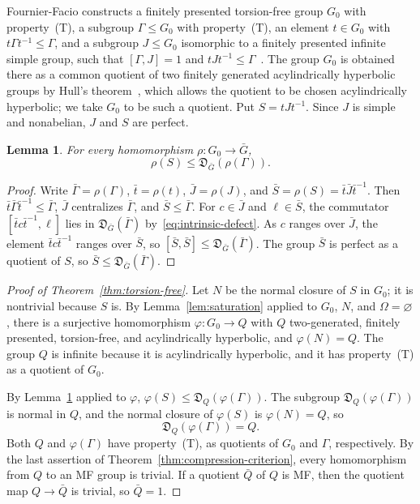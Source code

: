 \documentclass[11pt]{amsart}
\newtheorem{lemma}[theorem]{Lemma}
\theoremstyle{plain}
\begin{document}
Fournier-Facio constructs a finitely presented torsion-free group $G_0$
with property~\textup{(T)}, a subgroup $\Gamma\le G_0$ with
property~\textup{(T)}, an element $t\in G_0$ with
$t\Gamma t^{-1}\le\Gamma$, and a subgroup $J\le G_0$ isomorphic to a
finitely presented infinite simple group, such that $[\Gamma,J]=1$ and
$tJt^{-1}\le\Gamma$~\cite[\S2]{FFF}.  The group $G_0$ is obtained there
as a common quotient of two finitely generated acylindrically hyperbolic
groups by Hull's theorem~\cite[Corollary~7.4]{Hull}, which allows the
quotient to be chosen acylindrically hyperbolic; we take $G_0$ to be
such a quotient.  Put $S=tJt^{-1}$.  Since $J$ is simple and
nonabelian, $J$ and $S$ are perfect.

\begin{lemma}\label{lem:commutator-in-defect}
For every homomorphism $\rho\colon G_0\to\bar G$,
\[
 \rho(S)\le\mathfrak D_{\bar G}(\rho(\Gamma)).
\]
\end{lemma}

\begin{proof}
Write $\bar\Gamma=\rho(\Gamma)$, $\bar t=\rho(t)$, $\bar J=\rho(J)$, and
$\bar S=\rho(S)=\bar t\bar J\bar t^{-1}$.  Then
$\bar t\bar\Gamma\bar t^{-1}\le\bar\Gamma$, $\bar J$ centralizes
$\bar\Gamma$, and $\bar S\le\bar\Gamma$.  For $c\in\bar J$ and
$\ell\in\bar S$, the commutator $[\bar tc\bar t^{-1},\ell]$ lies in
$\mathfrak D_{\bar G}(\bar\Gamma)$ by~\eqref{eq:intrinsic-defect}.  As $c$
ranges over $\bar J$, the element $\bar tc\bar t^{-1}$ ranges over
$\bar S$, so $[\bar S,\bar S]\le\mathfrak D_{\bar G}(\bar\Gamma)$.  The
group $\bar S$ is perfect as a quotient of $S$, so
$\bar S\le\mathfrak D_{\bar G}(\bar\Gamma)$.
\end{proof}

\begin{proof}[Proof of Theorem~\ref{thm:torsion-free}]
Let $N$ be the normal closure of $S$ in $G_0$; it is nontrivial because
$S$ is.  By Lemma~\ref{lem:saturation} applied to $G_0$, $N$, and
$\Omega=\varnothing$, there is a surjective homomorphism
$\varphi\colon G_0\to Q$ with $Q$ two-generated, finitely presented,
torsion-free, and acylindrically hyperbolic, and $\varphi(N)=Q$.  The
group $Q$ is infinite because it is acylindrically hyperbolic, and it has
property~\textup{(T)} as a quotient of $G_0$.

By Lemma~\ref{lem:commutator-in-defect} applied to $\varphi$,
$\varphi(S)\le\mathfrak D_Q(\varphi(\Gamma))$.  The subgroup
$\mathfrak D_Q(\varphi(\Gamma))$ is normal in $Q$, and the normal
closure of $\varphi(S)$ is $\varphi(N)=Q$, so
\[
 \mathfrak D_Q(\varphi(\Gamma))=Q.
\]
Both $Q$ and $\varphi(\Gamma)$ have property~\textup{(T)}, as quotients of
$G_0$ and $\Gamma$, respectively.  By the last assertion of
Theorem~\ref{thm:compression-criterion}, every homomorphism from $Q$ to
an MF group is trivial.  If a quotient $\bar Q$ of $Q$ is MF, then the
quotient map $Q\to\bar Q$ is trivial, so $\bar Q=1$.
\end{proof}
\end{document}
